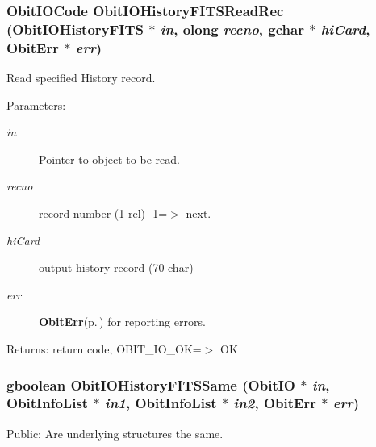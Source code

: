 \subsubsection{\setlength{\rightskip}{0pt plus 5cm}Obit\-IOCode Obit\-IOHistory\-FITSRead\-Rec ({\bf Obit\-IOHistory\-FITS} $\ast$ {\em in}, {\bf olong} {\em recno}, gchar $\ast$ {\em hi\-Card}, {\bf Obit\-Err} $\ast$ {\em err})}\label{ObitIOHistoryFITS_8c_a15}


Read specified History record. 

\begin{Desc}
\item[Parameters:]
\begin{description}
\item[{\em in}]Pointer to object to be read. \item[{\em recno}]record number (1-rel) -1=$>$ next. \item[{\em hi\-Card}]output history record (70 char) \item[{\em err}]{\bf Obit\-Err}{\rm (p.\,\pageref{structObitErr})} for reporting errors. \end{description}
\end{Desc}
\begin{Desc}
\item[Returns:]return code, OBIT\_\-IO\_\-OK=$>$ OK \end{Desc}
\subsubsection{\setlength{\rightskip}{0pt plus 5cm}gboolean Obit\-IOHistory\-FITSSame ({\bf Obit\-IO} $\ast$ {\em in}, {\bf Obit\-Info\-List} $\ast$ {\em in1}, {\bf Obit\-Info\-List} $\ast$ {\em in2}, {\bf Obit\-Err} $\ast$ {\em err})}\label{ObitIOHistoryFITS_8c_a9}


Public: Are underlying structures the same. 

